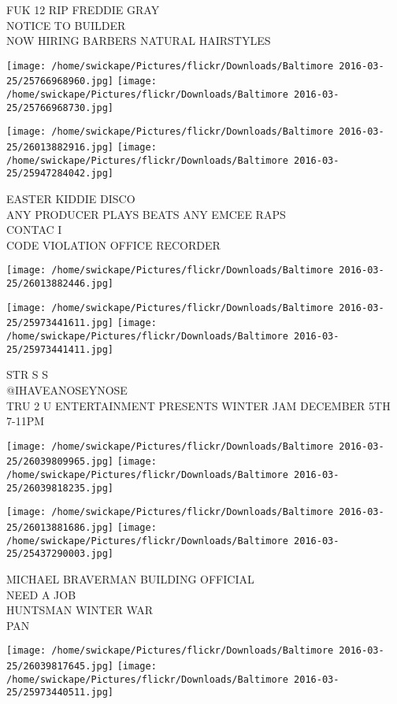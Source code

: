 \documentclass[10pt,letterpaper]{article}
\begin{document}
FUK 12 RIP FREDDIE GRAY\\
NOTICE TO BUILDER\\
NOW HIRING BARBERS NATURAL HAIRSTYLES
\pagebreak

\texttt{[image: /home/swickape/Pictures/flickr/Downloads/Baltimore 2016-03-25/25766968960.jpg]}
\texttt{[image: /home/swickape/Pictures/flickr/Downloads/Baltimore 2016-03-25/25766968730.jpg]}

\texttt{[image: /home/swickape/Pictures/flickr/Downloads/Baltimore 2016-03-25/26013882916.jpg]}
\texttt{[image: /home/swickape/Pictures/flickr/Downloads/Baltimore 2016-03-25/25947284042.jpg]}

EASTER KIDDIE DISCO\\
ANY PRODUCER PLAYS BEATS ANY EMCEE RAPS\\
CONTAC I\\
CODE VIOLATION OFFICE RECORDER
\pagebreak

\texttt{[image: /home/swickape/Pictures/flickr/Downloads/Baltimore 2016-03-25/26013882446.jpg]}

\vspace{0.25in}
\texttt{[image: /home/swickape/Pictures/flickr/Downloads/Baltimore 2016-03-25/25973441611.jpg]}
\texttt{[image: /home/swickape/Pictures/flickr/Downloads/Baltimore 2016-03-25/25973441411.jpg]}

STR S S\\
@IHAVEANOSEYNOSE\\
TRU 2 U ENTERTAINMENT PRESENTS WINTER JAM DECEMBER 5TH 7{-}11PM
\pagebreak

\texttt{[image: /home/swickape/Pictures/flickr/Downloads/Baltimore 2016-03-25/26039809965.jpg]}
\texttt{[image: /home/swickape/Pictures/flickr/Downloads/Baltimore 2016-03-25/26039818235.jpg]}

\texttt{[image: /home/swickape/Pictures/flickr/Downloads/Baltimore 2016-03-25/26013881686.jpg]}
\texttt{[image: /home/swickape/Pictures/flickr/Downloads/Baltimore 2016-03-25/25437290003.jpg]}

MICHAEL BRAVERMAN BUILDING OFFICIAL\\
NEED A JOB\\
HUNTSMAN WINTER WAR\\
PAN
\pagebreak

\texttt{[image: /home/swickape/Pictures/flickr/Downloads/Baltimore 2016-03-25/26039817645.jpg]}
\texttt{[image: /home/swickape/Pictures/flickr/Downloads/Baltimore 2016-03-25/25973440511.jpg]}
\end{document}
